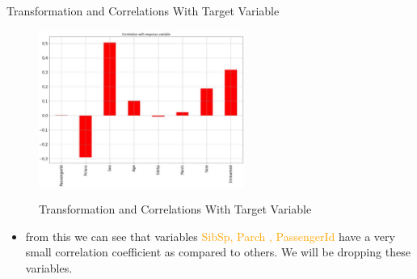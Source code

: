 \documentclass[
size=14pt,
paper=smartboard,  %
mode=present, 		%
display=slides, 	%
style=tuliplab,  	%
pauseslide,
fleqn,leqno]{powerdot}
\begin{document}
	
	\begin{slide}[toc=,bm=]{Transformation and Correlations With Target Variable}
		\vspace{-0.6cm}
		\begin{figure}
			\centering
			\includegraphics[width=0.6\textwidth]{figures//fig6.eps}\\
			\caption{Transformation and Correlations With Target Variable}
		\end{figure}
		\begin{itemize}
			\item
			from this we can see that variables \textcolor{orange}{SibSp, Parch , PassengerId} have a very small correlation coefficient as compared to others. We will be dropping these variables.
		\end{itemize}
		
	\end{slide}
	
\end{document}
